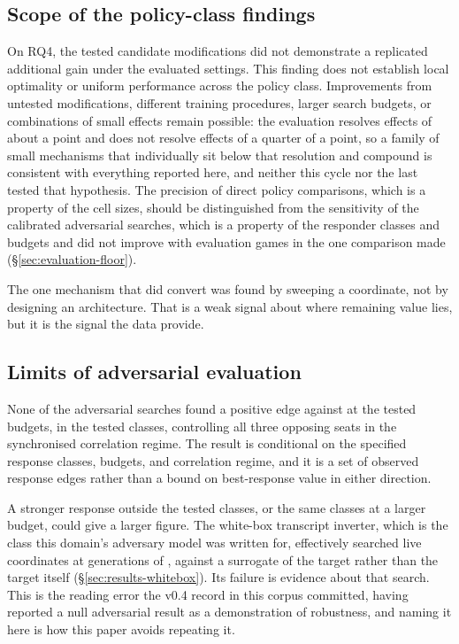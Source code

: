 \subsection{Scope of the policy-class findings}
\label{sec:discussion-limits}

On RQ4, the tested candidate modifications did not demonstrate a replicated additional gain under
the evaluated settings. This finding does not establish local optimality or uniform performance
across the policy class. Improvements from untested modifications, different training procedures,
larger search budgets, or combinations of small effects remain possible: the evaluation resolves
effects of about a point and does not resolve effects of a quarter of a point, so a family of small
mechanisms that individually sit below that resolution and compound is consistent with everything
reported here, and neither this cycle nor the last tested that hypothesis. The precision of direct
policy comparisons, which is a property of the cell sizes, should be distinguished from the
sensitivity of the calibrated adversarial searches, which is a property of the responder classes
and budgets and did not improve with evaluation games in the one comparison made
(\S\ref{sec:evaluation-floor}).

The one mechanism that did convert was found by sweeping a coordinate, not by designing an
architecture. That is a weak signal about where remaining value lies, but it is the signal the data
provide.

\subsection{Limits of adversarial evaluation}
\label{sec:discussion-exploit}

None of the \vsevenBfourArmsWord{} adversarial searches found a positive edge against \sestina{} at the
tested budgets, in the tested classes, controlling all three opposing seats in the synchronised
correlation regime. The result is conditional on the specified response classes, budgets, and
correlation regime, and it is a set of observed response edges rather than a bound on best-response
value in either direction.

A stronger response outside the tested classes, or the same classes at a larger budget, could give a
larger figure. The white-box transcript inverter, which is the class this domain's adversary model
was written for, effectively searched \vsevenZeightLive{} live coordinates at \vsevenBfourGens{}
generations of \vsevenBfourPop{}, against a \vsix{} surrogate of the target rather than the target
itself (\S\ref{sec:results-whitebox}). Its failure is evidence about that search. This is the
reading error the v0.4 record in this corpus committed, having reported a null adversarial result
as a demonstration of robustness, and naming it here is how this paper avoids repeating it.

